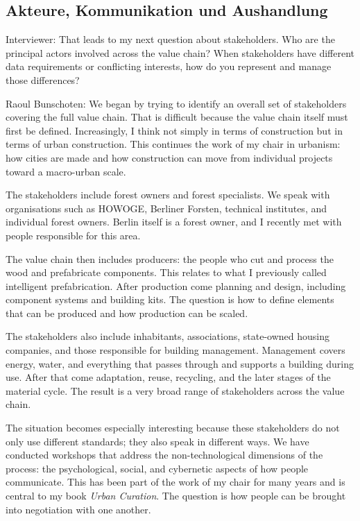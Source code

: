 \subsection{Akteure, Kommunikation und Aushandlung}

Interviewer: That leads to my next question about stakeholders. Who are the principal actors involved across the value chain? When stakeholders have different data requirements or conflicting interests, how do you represent and manage those differences?

Raoul Bunschoten: We began by trying to identify an overall set of stakeholders covering the full value chain. That is difficult because the value chain itself must first be defined. Increasingly, I think not simply in terms of construction but in terms of urban construction. This continues the work of my chair in urbanism: how cities are made and how construction can move from individual projects toward a macro-urban scale.

The stakeholders include forest owners and forest specialists. We speak with organisations such as HOWOGE, Berliner Forsten, technical institutes, and individual forest owners. Berlin itself is a forest owner, and I recently met with people responsible for this area.

The value chain then includes producers: the people who cut and process the wood and prefabricate components. This relates to what I previously called intelligent prefabrication. After production come planning and design, including component systems and building kits. The question is how to define elements that can be produced and how production can be scaled.

The stakeholders also include inhabitants, associations, state-owned housing companies, and those responsible for building management. Management covers energy, water, and everything that passes through and supports a building during use. After that come adaptation, reuse, recycling, and the later stages of the material cycle. The result is a very broad range of stakeholders across the value chain.

The situation becomes especially interesting because these stakeholders do not only use different standards; they also speak in different ways. We have conducted workshops that address the non-technological dimensions of the process: the psychological, social, and cybernetic aspects of how people communicate. This has been part of the work of my chair for many years and is central to my book \textit{Urban Curation}. The question is how people can be brought into negotiation with one another.

